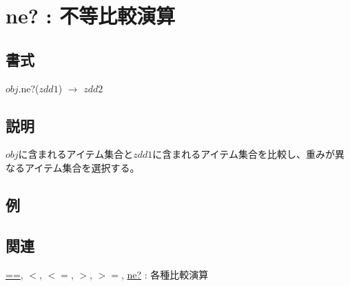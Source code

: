 
\section{ne? : 不等比較演算\label{sect:ne}}
\subsection*{書式}
$obj$.ne?($zdd1$) $\rightarrow$ $zdd2$

\subsection*{説明}
$obj$に含まれるアイテム集合と$zdd1$に含まれるアイテム集合を比較し、重みが異なるアイテム集合を選択する。

\subsection*{例}


\subsection*{関連}
\hyperref[sect:eq]{==},
\hyperref[sect:lt]{$<$},
\hyperref[sect:le]{$<=$},
\hyperref[sect:gt]{$>$},
\hyperref[sect:ge]{$>=$},
\hyperref[sect:ne]{ne?} : 各種比較演算
